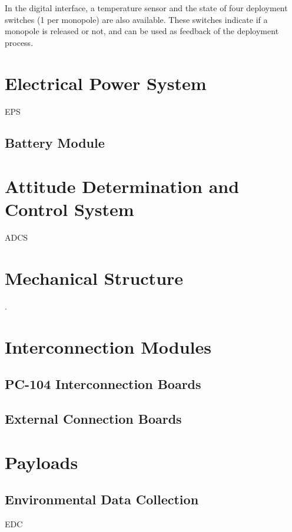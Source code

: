 In the digital interface, a temperature sensor and the state of four deployment switches (1 per monopole) are also available. These switches indicate if a monopole is released or not, and can be used as feedback of the deployment process.

\section{Electrical Power System}

EPS \cite{eps2}

\subsection{Battery Module}

\cite{bat4c}

\section{Attitude Determination and Control System}

ADCS

\section{Mechanical Structure}

.

\section{Interconnection Modules}

\subsection{PC-104 Interconnection Boards}

\cite{pc104-boards}

\subsection{External Connection Boards}

\cite{iip}

\section{Payloads}

\subsection{Environmental Data Collection}

EDC \cite{edc}
